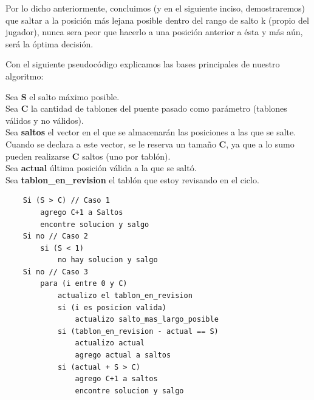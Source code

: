 \documentclass[10pt,a4paper]{article}
\begin{document}
Por lo dicho anteriormente, concluimos (y en el siguiente inciso, demostraremos) que saltar a la posición más lejana posible dentro del rango de salto k (propio del jugador), nunca sera peor que hacerlo a una posición anterior a ésta y más aún, será la óptima decisión.

Con el siguiente pseudocódigo explicamos las bases principales de nuestro algoritmo:

\noindent Sea \textbf{S} el salto m\'aximo posible.\\
Sea \textbf{C} la cantidad de tablones del puente pasado como par\'ametro (tablones v\'alidos y no v\'alidos).\\
Sea \textbf{saltos} el vector en el que se almacenar\'an las posiciones a las que se salte. Cuando se declara a este vector, se le reserva un tama\~no \textbf{C}, ya que a lo sumo pueden realizarse \textbf{C} saltos (uno por tabl\'on).\\
Sea \textbf{actual} última posición válida a la que se saltó.\\
Sea \textbf{tablon\_en\_revision} el tabl\'on que estoy revisando en el ciclo.\\

\begin{lstlisting}
	Si (S > C) // Caso 1
		agrego C+1 a Saltos
		encontre solucion y salgo
	Si no // Caso 2
		si (S < 1)	
			no hay solucion y salgo
	Si no // Caso 3
		para (i entre 0 y C)
			actualizo el tablon_en_revision
			si (i es posicion valida)
				actualizo salto_mas_largo_posible
			si (tablon_en_revision - actual == S)
				actualizo actual
				agrego actual a saltos
			si (actual + S > C)
				agrego C+1 a saltos
				encontre solucion y salgo

\end{lstlisting}
\end{document}
